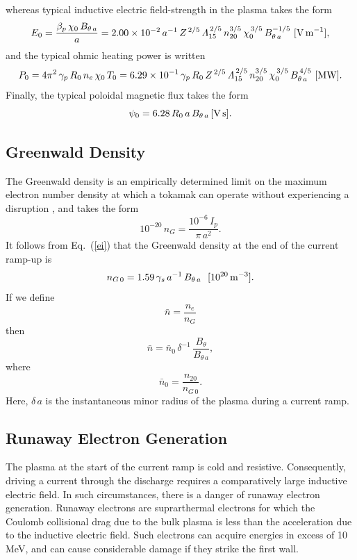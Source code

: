 \documentclass{iopjournal}
\begin{document}
 whereas typical inductive electric field-strength in the plasma takes the form
 \begin{equation}
 E_0 =\frac{\beta_p\,\chi_0\,B_{\theta\,a}}{a} = 2.00\times 10^{-2}\,a^{-1}\,Z^{\,2/5}\,{\mit\Lambda}_{15}^{\,2/5}\,n_{20}^{3/5}\,\chi_0^{\,3/5}\,B_{\theta\,a}^{-1/5}\,\,[{\rm V\,m}^{-1}],
 \end{equation}
 and the typical ohmic heating power is written
 \begin{equation}
 P_0 = 4\pi^2\,\gamma_p\,R_0\,n_e\,\chi_0\,T_0 = 6.29\times 10^{-1}\,\gamma_p\,R_0\,Z^{\,2/5}\,{\mit\Lambda}_{15}^{\,2/5}\,n_{20}^{3/5}\,\chi_0^{\,3/5}\,B_{\theta\,a}^{\,4/5}\,\,[{\rm MW}].
 \end{equation}
 Finally, the typical poloidal magnetic flux takes the form 
 \begin{equation}
 \psi_0= 6.28\,R_0\,a\,B_{\theta\,a}\,[{\rm V\,s}].
 \end{equation}
 
\subsection{Greenwald Density}
 The Greenwald density is an empirically determined limit on the maximum electron number density at which a tokamak can operate without experiencing a disruption \cite{green},
 and takes the form
 \begin{equation}
 10^{-20}\,n_{G} = \frac{10^{-6}\,I_{p}}{\pi\,a^2}.
 \end{equation}
 It follows from Eq.~(\ref{ei}) that the Greenwald density at the end of the  current ramp-up is
 \begin{equation}
 n_{G\,0} = 1.59\,\gamma_s \,a^{-1}\,B_{\theta\,a}~~[10^{20}\,{\rm m}^{-3}].
 \end{equation}
 If we define
 \begin{equation}\label{e26c}
 \bar{n} = \frac{n_e}{n_{G}}
 \end{equation}
 then 
 \begin{equation}
 \bar{n} = \bar{n}_0\,\delta^{-1}\,\frac{B_{\theta}}{B_{\theta\,a}},
  \end{equation}
  where
  \begin{equation}
  \bar{n}_0 = \frac{n_{20}}{n_{G\,0}}.
  \end{equation}
  Here, $\delta\,a$ is the instantaneous minor radius of the plasma during a current ramp. 
 
 
\subsection{Runaway Electron Generation}
 The plasma at the start of the current ramp is cold and resistive. Consequently, driving a current through the discharge requires a comparatively large inductive electric field. In such 
 circumstances, there is a danger of runaway electron generation. Runaway electrons are suprarthermal electrons for which the Coulomb collisional drag due to the bulk plasma is
 less than the acceleration due to the inductive electric field. Such electrons can acquire energies in excess of 10 MeV, and  can cause considerable damage if they strike the 
 first wall. 
 
\end{document}
